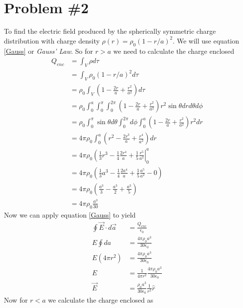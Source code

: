 \documentclass[11pt]{article}
\numberwithin{equation}{section}
\newcommand{\vecE}{\vec{E}}
\begin{document}
\section{Problem \#2}
To find the electric field produced by the spherically symmetric charge distribution with charge density $\rho(r) = \rho_0(1-r/a)^2$. We will use equation \ref{Gauss} or \emph{Gauss' Law}. So for $r>a$ we need to calculate the charge enclosed 
\begin{align*}
Q_{enc} &= \int_V\rho d\tau\\
&= \int_V\rho_0(1-r/a)^2 d\tau\\
&= \rho_0\int_V\left(1-\frac{2r}{a}+\frac{r^2}{a^2}\right) d\tau\\
&= \rho_0\int_0^{a}\int_0^{\pi}\int_0^{2\pi}\left(1-\frac{2r}{a}+\frac{r^2}{a^2}\right) r^2\sin\theta drd\theta d\phi\\
&= \rho_0\int_0^{\pi}\sin\theta d\theta\int_0^{2\pi}d\phi\int_0^{a}\left(1-\frac{2r}{a}+\frac{r^2}{a^2}\right) r^2dr\\
&= 4\pi\rho_0\int_0^{a}\left(r^2-\frac{2r^3}{a}+\frac{r^4}{a^2}\right)dr\\
&= 4\pi\rho_0\left(\frac{1}{3}r^3-\frac{1}{4}\frac{2r^4}{a}+\frac{1}{5}\frac{r^5}{a^2}\right|_0^a\\
&= 4\pi\rho_0\left(\frac{1}{3}a^3-\frac{1}{4}\frac{2a^4}{a}+\frac{1}{5}\frac{a^5}{a^2} - 0\right)\\
&= 4\pi\rho_0\left(\frac{a^3}{3}-\frac{a^3}{2}+\frac{a^3}{5}\right)\\
&= 4\pi\rho_0\frac{a^3}{30}
\end{align*}
Now we can apply equation \ref{Gauss} to yield
\begin{align*}
\oint\vec{E}\cdot d\vec{a} &= \frac{Q_{enc}}{\epsilon_0}\\
E\oint da &= \frac{4\pi\rho_0a^3}{30\epsilon_0}\\
E(4\pi r^2) &= \frac{4\pi\rho_0a^3}{30\epsilon_0}\\
E &= \frac{1}{4\pi r^2}\frac{4\pi\rho_0a^3}{30\epsilon_0}\\
\vecE &= \frac{\rho_0a^3}{30\epsilon_0}\frac{1}{r^2}\hat{r}
\end{align*}
Now for $r<a$ we calculate the charge enclosed as
\end{document}
